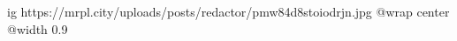  
 
 
 
 

\ifcmt
  ig https://mrpl.city/uploads/posts/redactor/pmw84d8stoiodrjn.jpg
  @wrap center
  @width 0.9
\fi
